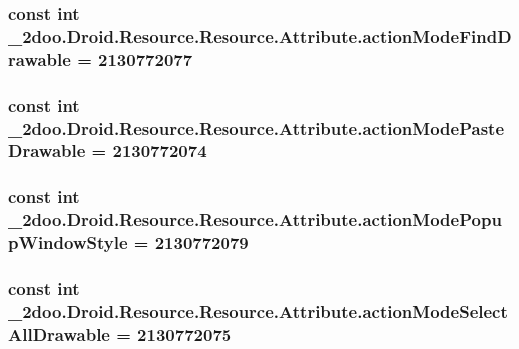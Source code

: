 \hypertarget{class__2doo_1_1_droid_1_1_resource_1_1_attribute_470e56ec860d59acb1ab753c52a94ecb}{
\subsubsection[{actionModeFindDrawable}]{\setlength{\rightskip}{0pt plus 5cm}const int \_\-2doo.Droid.Resource.Resource.Attribute.actionModeFindDrawable = 2130772077}}
\label{class__2doo_1_1_droid_1_1_resource_1_1_attribute_470e56ec860d59acb1ab753c52a94ecb}


\hypertarget{class__2doo_1_1_droid_1_1_resource_1_1_attribute_c08711a90b2eda03f8145f658a5affec}{
\subsubsection[{actionModePasteDrawable}]{\setlength{\rightskip}{0pt plus 5cm}const int \_\-2doo.Droid.Resource.Resource.Attribute.actionModePasteDrawable = 2130772074}}
\label{class__2doo_1_1_droid_1_1_resource_1_1_attribute_c08711a90b2eda03f8145f658a5affec}


\hypertarget{class__2doo_1_1_droid_1_1_resource_1_1_attribute_427be43de182d6767502c2427a07cc7c}{
\subsubsection[{actionModePopupWindowStyle}]{\setlength{\rightskip}{0pt plus 5cm}const int \_\-2doo.Droid.Resource.Resource.Attribute.actionModePopupWindowStyle = 2130772079}}
\label{class__2doo_1_1_droid_1_1_resource_1_1_attribute_427be43de182d6767502c2427a07cc7c}


\hypertarget{class__2doo_1_1_droid_1_1_resource_1_1_attribute_a1a4e7156acb5f9de0439464a348a9a0}{
\subsubsection[{actionModeSelectAllDrawable}]{\setlength{\rightskip}{0pt plus 5cm}const int \_\-2doo.Droid.Resource.Resource.Attribute.actionModeSelectAllDrawable = 2130772075}}
\label{class__2doo_1_1_droid_1_1_resource_1_1_attribute_a1a4e7156acb5f9de0439464a348a9a0}


